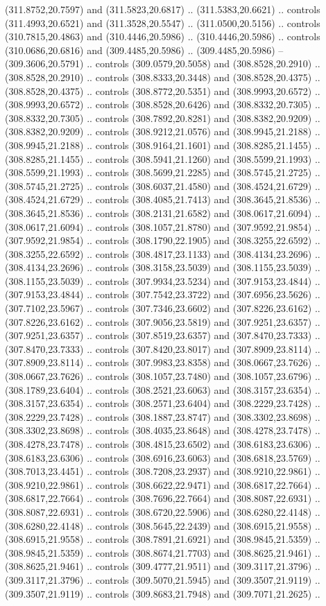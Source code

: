 (311.8752,20.7597) and (311.5823,20.6817) .. (311.5383,20.6621) .. controls (311.4993,20.6521) and (311.3528,20.5547) .. (311.0500,20.5156) .. controls (310.7815,20.4863) and (310.4446,20.5986) .. (310.4446,20.5986) .. controls (310.0686,20.6816) and (309.4485,20.5986) .. (309.4485,20.5986) -- (309.3606,20.5791) .. controls (309.0579,20.5058) and (308.8528,20.2910) .. (308.8528,20.2910) .. controls (308.8333,20.3448) and (308.8528,20.4375) .. (308.8528,20.4375) .. controls (308.8772,20.5351) and (308.9993,20.6572) .. (308.9993,20.6572) .. controls (308.8528,20.6426) and (308.8332,20.7305) .. (308.8332,20.7305) .. controls (308.7892,20.8281) and (308.8382,20.9209) .. (308.8382,20.9209) .. controls (308.9212,21.0576) and (308.9945,21.2188) .. (308.9945,21.2188) .. controls (308.9164,21.1601) and (308.8285,21.1455) .. (308.8285,21.1455) .. controls (308.5941,21.1260) and (308.5599,21.1993) .. (308.5599,21.1993) .. controls (308.5699,21.2285) and (308.5745,21.2725) .. (308.5745,21.2725) .. controls (308.6037,21.4580) and (308.4524,21.6729) .. (308.4524,21.6729) .. controls (308.4085,21.7413) and (308.3645,21.8536) .. (308.3645,21.8536) .. controls (308.2131,21.6582) and (308.0617,21.6094) .. (308.0617,21.6094) .. controls (308.1057,21.8780) and (307.9592,21.9854) .. (307.9592,21.9854) .. controls (308.1790,22.1905) and (308.3255,22.6592) .. (308.3255,22.6592) .. controls (308.4817,23.1133) and (308.4134,23.2696) .. (308.4134,23.2696) .. controls (308.3158,23.5039) and (308.1155,23.5039) .. (308.1155,23.5039) .. controls (307.9934,23.5234) and (307.9153,23.4844) .. (307.9153,23.4844) .. controls (307.7542,23.3722) and (307.6956,23.5626) .. (307.7102,23.5967) .. controls (307.7346,23.6602) and (307.8226,23.6162) .. (307.8226,23.6162) .. controls (307.9056,23.5819) and (307.9251,23.6357) .. (307.9251,23.6357) .. controls (307.8519,23.6357) and (307.8470,23.7333) .. (307.8470,23.7333) .. controls (307.8420,23.8017) and (307.8909,23.8114) .. (307.8909,23.8114) .. controls (307.9983,23.8358) and (308.0667,23.7626) .. (308.0667,23.7626) .. controls (308.1057,23.7480) and (308.1057,23.6796) .. (308.1789,23.6404) .. controls (308.2521,23.6063) and (308.3157,23.6354) .. (308.3157,23.6354) .. controls (308.2571,23.6404) and (308.2229,23.7428) .. (308.2229,23.7428) .. controls (308.1887,23.8747) and (308.3302,23.8698) .. (308.3302,23.8698) .. controls (308.4035,23.8648) and (308.4278,23.7478) .. (308.4278,23.7478) .. controls (308.4815,23.6502) and (308.6183,23.6306) .. (308.6183,23.6306) .. controls (308.6916,23.6063) and (308.6818,23.5769) .. (308.7013,23.4451) .. controls (308.7208,23.2937) and (308.9210,22.9861) .. (308.9210,22.9861) .. controls (308.6622,22.9471) and (308.6817,22.7664) .. (308.6817,22.7664) .. controls (308.7696,22.7664) and (308.8087,22.6931) .. (308.8087,22.6931) .. controls (308.6720,22.5906) and (308.6280,22.4148) .. (308.6280,22.4148) .. controls (308.5645,22.2439) and (308.6915,21.9558) .. (308.6915,21.9558) .. controls (308.7891,21.6921) and (308.9845,21.5359) .. (308.9845,21.5359) .. controls (308.8674,21.7703) and (308.8625,21.9461) .. (308.8625,21.9461) .. controls (309.4777,21.9511) and (309.3117,21.3796) .. (309.3117,21.3796) .. controls (309.5070,21.5945) and (309.3507,21.9119) .. (309.3507,21.9119) .. controls (309.8683,21.7948) and (309.7071,21.2625) .. 